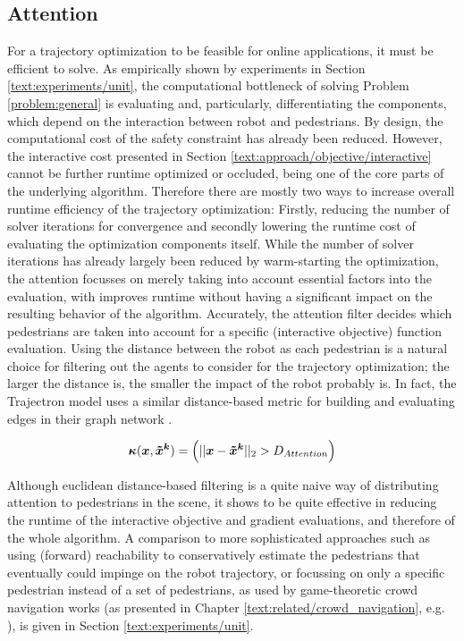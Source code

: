 \subsection{Attention}
\label{text:approach/runtime/filtering}
For a trajectory optimization to be feasible for online applications, it must be efficient to solve. As empirically shown by experiments in Section \ref{text:experiments/unit}, the computational bottleneck of solving Problem \ref{problem:general} is evaluating and, particularly, differentiating the components, which depend on the interaction between robot and pedestrians. By design, the computational cost of the safety constraint has already been reduced. However, the interactive cost presented in Section \ref{text:approach/objective/interactive} cannot be further runtime optimized or occluded, being one of the core parts of the underlying algorithm. Therefore there are mostly two ways to increase overall runtime efficiency of the trajectory optimization: Firstly, reducing the number of solver iterations for convergence and secondly lowering the runtime cost of evaluating the optimization components itself.
\newline
While the number of solver iterations has already largely been reduced by warm-starting the optimization, the attention focusses on merely taking into account essential factors into the evaluation, with improves runtime without having a significant impact on the resulting behavior of the algorithm. Accurately, the attention filter decides which pedestrians are taken into account for a specific (interactive objective) function evaluation.
\newline
Using the distance between the robot as each pedestrian is a natural choice for filtering out the agents to consider for the trajectory optimization; the larger the distance is, the smaller the impact of the robot probably is. In fact, the Trajectron model uses a similar distance-based metric for building and evaluating edges in their graph network \cite{Salzmann2020}.

\begin{equation}
\attention(\x, \xped[k]) = \left( ||\x - \xped[k]||_2 > D_{Attention} \right)
\end{equation}

Although euclidean distance-based filtering is a quite naive way of distributing attention to pedestrians in the scene, it shows to be quite effective in reducing the runtime of the interactive objective and gradient evaluations, and therefore of the whole algorithm. A comparison to more sophisticated approaches such as using (forward) reachability to conservatively estimate the pedestrians that eventually could impinge on the robot trajectory, or focussing on only a specific pedestrian instead of a set of pedestrians, as used by game-theoretic crowd navigation works (as presented in Chapter \ref{text:related/crowd_navigation}, e.g.\,  \cite{Bouzat2014}\cite{Nikolaidis2017}), is given in Section \ref{text:experiments/unit}.